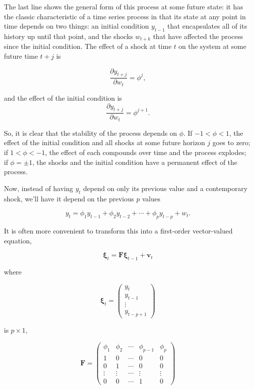 \documentclass{tufte-book}
\begin{document}
The last line shows the general form of this process at some future state: it has the classic characteristic of a time series process in that its state at any point in time depends on two things: an initial condition $y_{t-1}$ that encapsulates all of its history up until that point, and the shocks $w_{t+k}$ that have affected the process since the initial condition. The effect of a shock at time $t$ on the system at some future time $t+j$ is

\begin{equation}
\frac{\partial y_{t+j}}{\partial w_t} = \phi^j,
\end{equation}

\noindent and the effect of the initial condition is
\begin{equation}
\frac{\partial y_{t+j}}{\partial w_t} = \phi^{j+1}.
\end{equation}

\noindent So, it is clear that the stability of the process depends on $\phi$. If $-1 < \phi < 1$, the effect of the initial condition and all shocks at some future horizon $j$ goes to zero; if $1 < \phi < -1$, the effect of each compounds over time and the process explodes; if $\phi = \pm 1$, the shocks and the initial condition have a permanent effect of the process.

Now, instead of having $y_t$ depend on only its previous value and a contemporary shock, we'll have it depend on the previous $p$ values

\[
y_t = \phi_1 y_{t-1} + \phi_2 y_{t-2} + \cdots + \phi_p y_{t-p} + w_t.
\]

\noindent It is often more convenient to transform this into a first-order vector-valued equation,
 
\begin{equation}
\bm{\xi}_t = \bm{F} \bm{\xi}_{t-1} + \bm{v}_t \label{eq: p-order vector}
\end{equation}

\noindent where 

\[
\bm{\xi}_t = \begin{pmatrix}
y_t \\
y_{t-1} \\
\vdots \\
y_{t-p+1}
\end{pmatrix}
\]

\noindent is $p \times 1$,

\[
\bm{F} = \begin{pmatrix}
\phi_1  & \phi_2    & \cdots    & \phi_{p-1}    & \phi_p    \\
1       & 0         & \cdots    & 0         & 0         \\
0       & 1         & \cdots    & 0         & 0         \\
\vdots  & \vdots    & \cdots    & \vdots    & \vdots    \\
0       & 0         & \cdots    & 1         & 0
\end{pmatrix}
\]
\end{document}
